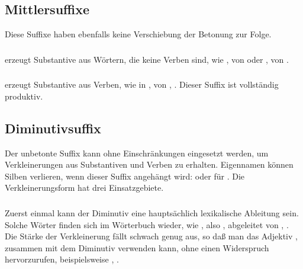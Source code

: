 \subsection{Mittlersuffixe} Diese Suffixe haben ebenfalls keine Verschiebung der Betonung zur Folge.

\subsubsection{}  erzeugt Substantive aus W\"ortern, die keine Verben sind, wie
,  von   oder ,
 von  .

\subsubsection{}  erzeugt Substantive aus Verben, wie in ,  von
, . Dieser Suffix ist vollst\"andig produktiv.



\subsection{Diminutivsuffix} Der unbetonte Suffix  kann ohne Einschr\"ankungen
eingesetzt werden, um Verkleinerungen aus Substantiven und Verben zu erhalten. Eigennamen
k\"onnen Silben verlieren, wenn dieser Suffix angeh\"angt wird:  oder
 f\"ur . Die Verkleinerungsform hat drei Einsatzgebiete.
\label{lingop:dimin}

\subsubsection{} Zuerst einmal kann der Diminutiv eine haupts\"achlich lexikalische
Ableitung sein. Solche W\"orter finden sich im W\"orterbuch wieder, wie ,
also , abgeleitet von , . Die
St\"arke der Verkleinerung f\"allt schwach genug aus, so da\ss{} man das Adjektiv
,  zusammen mit dem Diminutiv verwenden kann, ohne einen Widerspruch
hervorzurufen, beispielsweise , .

